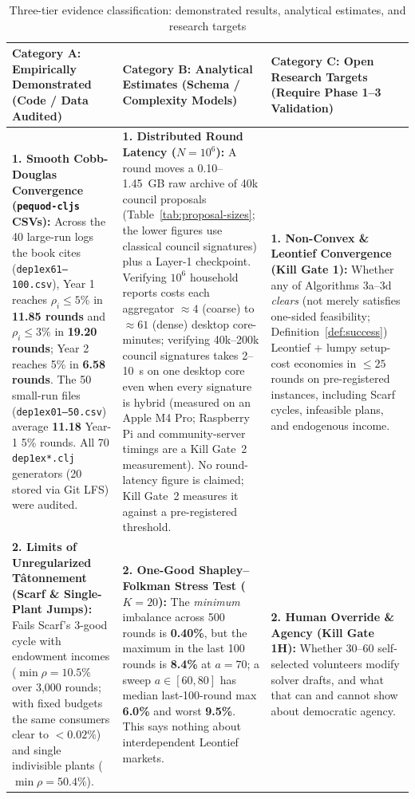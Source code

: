 \documentclass[10pt,twoside,openany]{book}
\theoremstyle{dpepstyle}
\begin{document}
\begin{table}[htbp]
\centering
\caption{Three-tier evidence classification: demonstrated results, analytical estimates, and research targets}
\label{tab:exec-feasibility}
\scriptsize
\setlength{\tabcolsep}{3.5pt}
\begin{tabularx}{\textwidth}{L{1.45in} L{1.55in} Y}
\toprule
\textbf{Category A: Empirically Demonstrated (Code / Data Audited)} & \textbf{Category B: Analytical Estimates (Schema / Complexity Models)} & \textbf{Category C: Open Research Targets (Require Phase 1--3 Validation)} \\
\midrule
\textbf{1. Smooth Cobb-Douglas Convergence (\texttt{pequod-cljs} CSVs):} Across the 40 large-run logs the book cites (\texttt{dep1ex61--100.csv}),\footnotemark{} Year 1 reaches $\rho_i \le 5\%$ in \textbf{11.85 rounds} and $\rho_i \le 3\%$ in \textbf{19.20 rounds}; Year 2 reaches 5\% in \textbf{6.58 rounds}. The 50 small-run files (\texttt{dep1ex01--50.csv}) average \textbf{11.18} Year-1 5\% rounds. All 70 \texttt{dep1ex*.clj} generators (20 stored via Git LFS) were audited. & \textbf{1. Distributed Round Latency ($N=10^6$):} A round moves a 0.10--1.45~GB raw archive of 40k council proposals (Table~\ref{tab:proposal-sizes}; the lower figures use classical council signatures) plus a Layer-1 checkpoint. Verifying $10^6$ household reports costs each aggregator $\approx 4$ (coarse) to $\approx 61$ (dense) desktop core-minutes; verifying 40k--200k council signatures takes 2--10~s on one desktop core even when every signature is hybrid (measured on an Apple M4 Pro; Raspberry Pi and community-server timings are a Kill Gate~2 measurement). No round-latency figure is claimed; Kill Gate~2 measures it against a pre-registered threshold. & \textbf{1. Non-Convex \& Leontief Convergence (Kill Gate 1):} Whether any of Algorithms 3a--3d \emph{clears} (not merely satisfies one-sided feasibility; Definition~\ref{def:success}) Leontief + lumpy setup-cost economies in $\le 25$ rounds on pre-registered instances, including Scarf cycles, infeasible plans, and endogenous income. \\
\addlinespace[4pt]
\textbf{2. Limits of Unregularized T\^atonnement (Scarf \& Single-Plant Jumps):} Fails Scarf's 3-good cycle with endowment incomes ($\min \rho = 10.5\%$ over 3,000 rounds; with fixed budgets the same consumers clear to $<0.02\%$) and single indivisible plants ($\min \rho = 50.4\%$). & \textbf{2. One-Good Shapley--Folkman Stress Test ($K=20$):} The \emph{minimum} imbalance across 500 rounds is \textbf{0.40\%}, but the maximum in the last 100 rounds is \textbf{8.4\%} at $a=70$; a sweep $a\in[60,80]$ has median last-100-round max \textbf{6.0\%} and worst \textbf{9.5\%}. This says nothing about interdependent Leontief markets. & \textbf{2. Human Override \& Agency (Kill Gate 1H):} Whether 30--60 self-selected volunteers modify solver drafts, and what that can and cannot show about democratic agency. \\

\end{tabularx}
\end{table}
\end{document}
